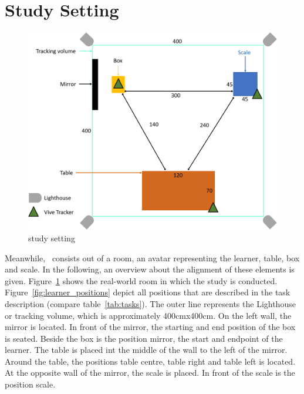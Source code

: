 \section{Study Setting}
\begin{figure}[H]
	\centering
	\includegraphics[width=\textwidth]{figures/study_setting.png}
	\caption[study setting]{study setting}
	\label{fig:study_setting}
\end{figure}
Meanwhile, \exgo\ consists out of a room, an avatar representing the learner, table, box and scale. In the following, an overview about the alignment of these elements is given. Figure~\ref{fig:study_setting} shows the real-world room in which the study is conducted. Figure~\ref{fig:learner_positions} depict all positions that are described in the task description (compare table~\ref{tab:tasks}). The outer line represents the Lighthouse or tracking volume, which is approximately 400cmx400cm. On the left wall, the mirror is located. In front of the mirror, the starting and end position of the box is seated. Beside the box is the position mirror, the start and endpoint of the learner. The table is placed int the middle of the wall to the left of the mirror. Around the table, the positions table centre, table right and table left is located. At the opposite wall of the mirror, the scale is placed. In front of the scale is the position scale.
